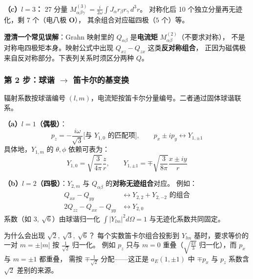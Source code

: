 \textbf{（c）$l=3$：} 27 分量 $M^{(3)}_{\alpha\beta\gamma}=\frac{i}{2\omega}\int J_\alpha r_\beta r_\gamma\,d^3r$。
对称化后 10 个独立分量再无迹化，剩 $7$ 个（电八极 $\mathbf{O}$），
其余组合对应磁四极（$5$ 个）等。

\begin{nontrivial}
\textbf{澄清一个常见误解}：Grahn 映射里的 $Q_{\alpha\beta}$ 是\textbf{电流矩} $M^{(2)}_{\alpha\beta}$（不要求对称），
不是对称电四极矩本身。映射公式中出现 $Q_{xz}-Q_{zx}$ 这类\textbf{反对称组合}，
正因为磁偶极来自反对称部分。下表列关系时须区分两种 $Q$。
\end{nontrivial}

\subsubsection{第 2 步：球谐 $\to$ 笛卡尔的基变换}

辐射系数按球谐编号 $(l,m)$，电流矩按笛卡尔分量编号。二者通过固体球谐联系。

\textbf{（a）$l=1$（偶极）}：
\begin{equation}
  p_z = -\frac{i\omega}{\sqrt{3}}\bigl[\text{与 }Y_{1,0}\text{ 的匹配项}\bigr],
  \qquad
  p_x \pm ip_y \longleftrightarrow Y_{1,\pm1}
\end{equation}
具体地，$Y_{1,m}$ 的 $\theta,\phi$ 依赖可表为：
\begin{equation}
  Y_{1,0}=\sqrt{\frac{3}{4\pi}}\frac{z}{r},\qquad
  Y_{1,\pm1}=\mp\sqrt{\frac{3}{8\pi}}\frac{x\pm iy}{r}
\end{equation}

\textbf{（b）$l=2$（四极）}：$Y_{2,m}$ 与 $Q_{\alpha\beta}$ 的\textbf{对称无迹组合}对应。
例如：
\begin{align}
  Q_{xx}-Q_{yy} &\longleftrightarrow Y_{2,2} + Y_{2,-2} \text{ 的组合}\\
  2Q_{zz}-Q_{xx}-Q_{yy} &\longleftrightarrow Y_{2,0}
\end{align}
系数（如 $3,\ \sqrt{6}$）由球谐归一化 $\int|Y_{lm}|^2d\Omega=1$ 与无迹化系数共同固定。

\begin{stepbox}{为什么会出现 $\sqrt{2},\ \sqrt{3},\ \sqrt{6}$？}
每个实数笛卡尔组合投影到 $Y_{lm}$ 基时，要求等价的一对 $m=\pm|m|$ 按 $\frac{1}{\sqrt2}$ 归一化。
例如 $p_z$ 只与 $m=0$ 重叠（$\sqrt{\frac{4\pi}{3}}$ 归一化），而 $p_x$ 与 $m=\pm1$ 都重叠，
需按 $\mp\frac{1}{\sqrt2}$ 分配——这正是 $a_E(1,\pm1)$ 中 $\mp p_x$ 与 $p_z$ 系数含 $\sqrt2$ 差别的来源。
\end{stepbox}

